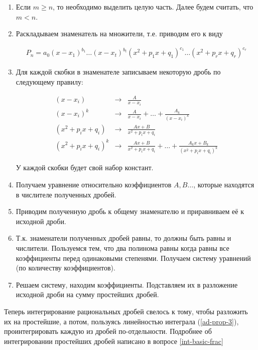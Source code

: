 \begin{enumerate}
  \item Если \(m \ge n\), то необходимо выделить целую часть. Далее будем
  считать, что \(m < n\).
  
  \item Раскладываем знаменатель на множители, т.е. приводим его к виду
  
  \begin{align*}
    P_{n} = a_{0}
      (x - x_{1})^{b_{1}} \dotsc (x - x_{t})^{b_{t}}
      (x^2 + p_{1} x + q_{1})^{c_{1}} \dots (x^2 + p_{r} x + q_{r})^{c_{r}}
  \end{align*}

  \item Для каждой скобки в знаменателе записываем некоторую дробь по
  следующему правилу:
  
  \begin{align*}
    (x - x_{i}) & \to & \frac{A}{x - x_{i}}
    \\
    (x - x_{i})^{k} & \to & \frac{A}{x - x_{i}}
      + \dotsc + \frac{A_k}{(x - x_{i})^{k}}
    \\
    (x^2 + p_{i} x + q_{i}) & \to & \frac{Ax + B}{x^2 + p_{i} x + q_{i}}
    \\
    (x^2 + p_{i} x + q_{i})^{k} & \to & \frac{Ax + B}{x^2 + p_{i} x + q_{i}}
      + \dotsc + \frac{A_{k}x + B_{k}}{(x^2 + p_{i} x + q_{i})^{k}}
  \end{align*}

  У каждой скобки будет свой набор констант.

  \item Получаем уравнение относительно коэффициентов \(A, B \dots\), которые
  находятся в числителе полученных дробей.

  \item Приводим полученную дробь к общему знаменателю и приравниваем её к
  исходной дроби.

  \item Т.к. знаменатели полученных дробей равны, то должны быть равны и
  числители. Пользуемся тем, что два полинома равны когда равны все коэффициенты
  перед одинаковыми степенями. Получаем систему уравнений (по количеству
  коэффициентов).

  \item Решаем систему, находим коэффициенты. Подставляем их в разложение
  исходной дроби на сумму простейших дробей.
\end{enumerate}

Теперь интегрирование рациональных дробей свелось к тому, чтобы разложить их
на простейшие, а потом, пользуясь линейностью интеграла (\ref{ad-prop-3}),
проинтегрировать каждую из дробей по-отдельности.
Подробнее об интегрировании простейших дробей написано в вопросе
\ref{int-basic-frac}

